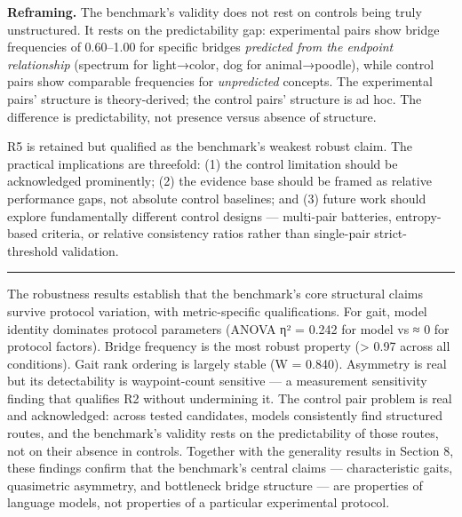 \textbf{Reframing.} The benchmark's validity does not rest on controls being truly unstructured. It rests on the predictability gap: experimental pairs show bridge frequencies of 0.60--1.00 for specific bridges \emph{predicted from the endpoint relationship} (spectrum for light→color, dog for animal→poodle), while control pairs show comparable frequencies for \emph{unpredicted} concepts. The experimental pairs' structure is theory-derived; the control pairs' structure is ad hoc. The difference is predictability, not presence versus absence of structure.

R5 is retained but qualified as the benchmark's weakest robust claim. The practical implications are threefold: (1) the control limitation should be acknowledged prominently; (2) the evidence base should be framed as relative performance gaps, not absolute control baselines; and (3) future work should explore fundamentally different control designs --- multi-pair batteries, entropy-based criteria, or relative consistency ratios rather than single-pair strict-threshold validation.

\begin{center}\rule{0.5\linewidth}{0.5pt}\end{center}

The robustness results establish that the benchmark's core structural claims survive protocol variation, with metric-specific qualifications. For gait, model identity dominates protocol parameters (ANOVA η² = 0.242 for model vs ≈ 0 for protocol factors). Bridge frequency is the most robust property (\textgreater{} 0.97 across all conditions). Gait rank ordering is largely stable (W = 0.840). Asymmetry is real but its detectability is waypoint-count sensitive --- a measurement sensitivity finding that qualifies R2 without undermining it. The control pair problem is real and acknowledged: across tested candidates, models consistently find structured routes, and the benchmark's validity rests on the predictability of those routes, not on their absence in controls. Together with the generality results in Section 8, these findings confirm that the benchmark's central claims --- characteristic gaits, quasimetric asymmetry, and bottleneck bridge structure --- are properties of language models, not properties of a particular experimental protocol.
